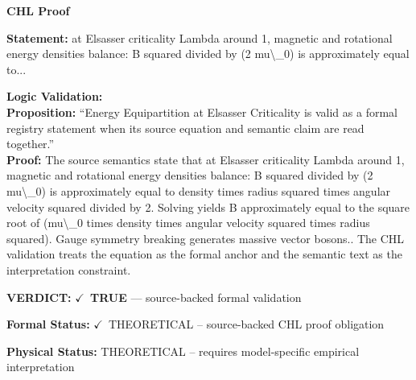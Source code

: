 \vspace{0.45em}
\noindent\textbf{CHL Proof}\par
\textbf{Statement:} at Elsasser criticality Lambda around 1, magnetic and rotational energy densities
balance: B squared divided by (2 mu\textbackslash{}\_0) is approximately equal to...

\textbf{Logic Validation:}\\
\textbf{Proposition:} ``Energy Equipartition at Elsasser Criticality is valid as a formal registry statement
when its source equation and semantic claim are read together.''\\
\textbf{Proof:} The source semantics state that at Elsasser criticality Lambda around 1, magnetic and
rotational energy densities balance: B squared divided by (2 mu\textbackslash{}\_0) is approximately
equal to density times radius squared times angular velocity squared divided by 2.
Solving yields B approximately equal to the square root of (mu\textbackslash{}\_0 times density times
angular velocity squared times radius squared). Gauge symmetry breaking generates
massive vector bosons.. The CHL validation treats the equation as the formal anchor and
the semantic text as the interpretation constraint.

\textbf{VERDICT:} \ensuremath{\checkmark}\ \textbf{TRUE} --- source-backed formal validation

\textbf{Formal Status:} \ensuremath{\checkmark}\ THEORETICAL -- source-backed CHL proof obligation

\textbf{Physical Status:} THEORETICAL -- requires model-specific empirical interpretation
\par\vspace{0.45em}
\par
\ifTZPDarkEdition
{}
\fi
\endgroup
\endgroup
